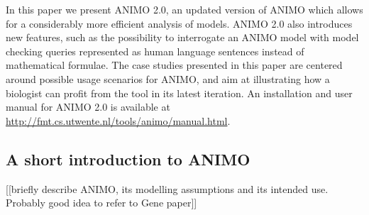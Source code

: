 \documentclass{bmcart}
\def\tas{Timed Automata}
\begin{document}


In this paper we present ANIMO 2.0, an updated version of ANIMO which allows for a considerably
more efficient analysis of models. ANIMO 2.0 also introduces new features, such as the possibility to interrogate
an ANIMO model with model checking queries represented as human language sentences instead of
mathematical formulae. The case studies presented in this paper are centered around possible usage scenarios
for ANIMO, and aim at illustrating how a biologist can profit from the tool in its latest iteration.
An installation and user manual for ANIMO 2.0 is available at \url{http://fmt.cs.utwente.nl/tools/animo/manual.html}.

\subsection*{A short introduction to ANIMO}
{\Large [[briefly describe ANIMO, its modelling assumptions and its intended use. Probably good idea
to refer to Gene paper]]}
\end{document}
